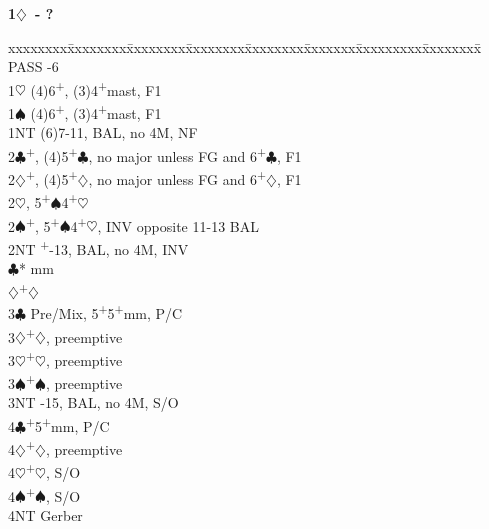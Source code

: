 \documentclass[10pt]{article}
\renewcommand{\c}{$\clubsuit$}
\renewcommand{\d}{$\diamondsuit$}
\newcommand{\h}{$\heartsuit$}
\newcommand{\s}{$\spadesuit$}
\newcommand{\p}{\textsuperscript{+}}
\newcommand{\m}{\textsuperscript{\textminus}}
\newenvironment{bidtable}[1][]
{\textbf{#1}
  \begin{adjustwidth}{1em}{}
    \addvspace{2pt}
    \begin{tabbing}
      xxxxxxxx\=xxxxxxxx\=xxxxxxxx\=xxxxxxxx\=xxxxxxxx\=xxxxxxx\=xxxxxxxxx\=xxxxxxxx\=\kill}
{\end{tabbing}\end{adjustwidth}\bigskip}%
\begin{document}
\begin{bidtable}[1\d\ - ?]
PASS      -6                                              \\
1\h       \> (4)6\p , (3)4\p mast, F1                         \\
1\s       \> (4)6\p , (3)4\p mast, F1                         \\
1NT       \> (6)7-11\m, BAL, no 4M, NF                        \\
2\c       {}\p, (4)5\p\c, no major unless FG and 6\p\c, F1 \\
2\d       {}\p, (4)5\p\d, no major unless FG and 6\p\d, F1 \\
2\h       {}\m, 5\p\s 4\p\h                               \\
2\s       {}\p, 5\p\s 4\p\h, INV opposite 11-13 BAL        \\
2NT       \p-13, BAL, no 4M, INV                         \\
          \c* {} mm                                    \\
          \d  {}\p\d                                    \\
3\c       \> Pre/Mix, 5\p 5\p mm, P/C                         \\
3\d       {}\p\d, preemptive                                \\
3\h       {}\p\h, preemptive                                \\
3\s       {}\p\s, preemptive                                \\
3NT       -15, BAL, no 4M, S/O                           \\
4\c       {}\p 5\p mm, P/C                                  \\
4\d       {}\p\d, preemptive                                \\
4\h       {}\p\h, S/O                                       \\
4\s       {}\p\s, S/O                                       \\
4NT       \> Gerber
\end{bidtable}
\end{document}
